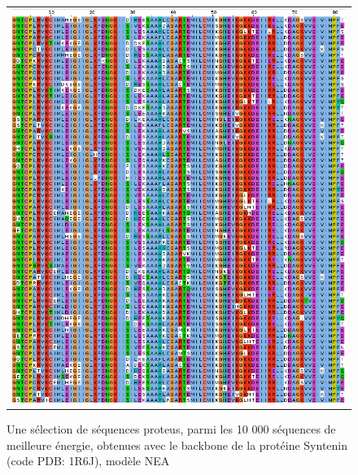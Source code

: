    \begin{figure}[t]
     \centering
     \begin{tabular}{c}
       \includegraphics[width=17cm]{proteus/1R6J.png} \\
     \end{tabular}
       \caption{Une sélection de séquences proteus, parmi les 10 000 séquences de meilleure énergie, obtenues avec le backbone de la protéine Syntenin (code PDB: 1R6J), modèle NEA}
\label{align_proteus:Syntenin}
   \end{figure}
\clearpage

